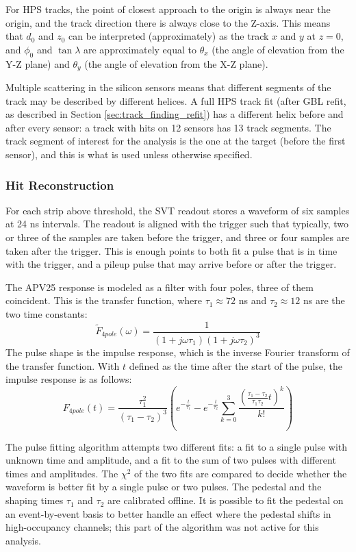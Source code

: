 For HPS tracks, the point of closest approach to the origin is always near the origin, and the track direction there is always close to the Z-axis.
This means that $d_0$ and $z_0$ can be interpreted (approximately) as the track $x$ and $y$ at $z=0$, and $\phi_0$ and $\tan\lambda$ are approximately equal to $\theta_x$ (the angle of elevation from the Y-Z plane) and $\theta_y$ (the angle of elevation from the X-Z plane).

Multiple scattering in the silicon sensors means that different segments of the track may be described by different helices.
A full HPS track fit (after GBL refit, as described in Section \ref{sec:track_finding_refit}) has a different helix before and after every sensor: a track with hits on 12 sensors has 13 track segments.
The track segment of interest for the analysis is the one at the target (before the first sensor), and this is what is used unless otherwise specified.

\subsubsection{Hit Reconstruction}
\label{sec:svt_hit_recon}
For each strip above threshold, the SVT readout stores a waveform of six samples at 24 ns intervals.
The readout is aligned with the trigger such that typically, two or three of the samples are taken before the trigger, and three or four samples are taken after the trigger.
This is enough points to both fit a pulse that is in time with the trigger, and a pileup pulse that may arrive before or after the trigger.

The APV25 response is modeled as a filter with four poles, three of them coincident.
This is the transfer function, where $\tau_1\approx 72$ ns and $\tau_2\approx 12$ ns are the two time constants:
\begin{equation}
    \tilde{F}_{4pole}(\omega) = \frac{1}{(1+j\omega\tau_1)(1+j\omega\tau_2)^3}
\end{equation}
The pulse shape is the impulse response, which is the inverse Fourier transform of the transfer function.
With $t$ defined as the time after the start of the pulse, the impulse response is as follows:
\begin{equation}
    F_{4pole}(t) = \frac{\tau_1^2}{(\tau_1-\tau_2)^3} \left( e^{-\frac{t}{\tau_1}} - e^{-\frac{t}{\tau_2}} \sum_{k=0}^3 \frac{\left(\frac{\tau_1-\tau_2}{\tau_1\tau_2}t\right)^k}{k!} \right)
\end{equation}

The pulse fitting algorithm attempts two different fits: a fit to a single pulse with unknown time and amplitude, and a fit to the sum of two pulses with different times and amplitudes.
The $\chi^2$ of the two fits are compared to decide whether the waveform is better fit by a single pulse or two pulses.
The pedestal and the shaping times $\tau_1$ and $\tau_2$ are calibrated offline.
It is possible to fit the pedestal on an event-by-event basis to better handle an effect where the pedestal shifts in high-occupancy channels; this part of the algorithm was not active for this analysis.

